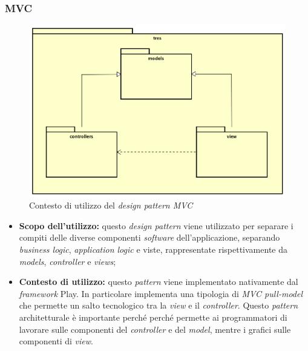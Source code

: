 \subsubsection{MVC}
\begin{figure}[h]
\centering
\includegraphics[scale=0.20]{immagini/mvc}
\caption{Contesto di utilizzo del \emph{design pattern MVC}}
\label{fig:pattern-mvc}
\end{figure}
\begin{itemize}
\item\textbf{Scopo dell'utilizzo:} questo \emph{design pattern} viene utilizzato per separare i compiti delle diverse componenti \emph{software} dell'applicazione, separando \emph{business logic}, \emph{application logic} e viste, rappresentate rispettivamente da \emph{models}, \emph{controller} e \emph{views};
\item \textbf{Contesto di utilizzo:} questo \emph{pattern} viene implementato nativamente dal \emph{framework} Play. In particolare implementa una tipologia di \emph{MVC pull-model} che permette un salto tecnologico tra la \emph{view} e il \emph{controller}. Questo \emph{pattern} architetturale è importante perché perché permette ai programmatori di lavorare sulle componenti del \emph{controller} e del \emph{model}, mentre i grafici sulle componenti di \emph{view}.
\end{itemize}
